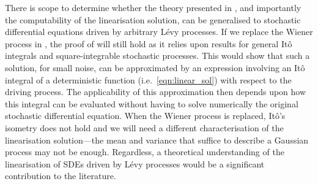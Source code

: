 There is scope to determine whether the theory presented in , and importantly the computability of the linearisation solution, can be generalised to stochastic differential equations driven by arbitrary L\'evy processes.
If we replace the Wiener process in , the proof of  will still hold as it relies upon results for general It\^o integrals and square-integrable stochastic processes.
This would show that such a solution, for small noise, can be approximated by an expression involving an It\^o integral of a deterministic function (i.e.\ \cref{eqn:linear_sol}) with respect to the driving process.
The applicability of this approximation then depends upon how this integral can be evaluated without having to solve numerically the original stochastic differential equation.
When the Wiener process is replaced, It\^o's isometry does not hold and we will need a different characterisation of the linearisation solution---the mean and variance that suffice to describe a Gaussian process may not be enough.
Regardless, a theoretical understanding of the linearisation of SDEs driven by L\'evy processes would be a significant contribution to the literature.



